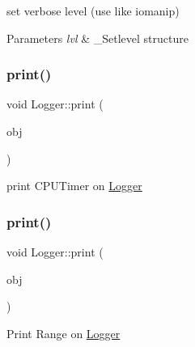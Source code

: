set verbose level (use like iomanip) 
\begin{DoxyParams}{Parameters}
{\em lvl} & \+\_\+\+Setlevel structure \\
\hline
\end{DoxyParams}
\mbox{\label{classez_1_1logging_1_1Logger_a5660d40a1364e37393b3241435ed5a64}} 
\subsubsection{\texorpdfstring{print()}{print()}\hspace{0.1cm}{\footnotesize\ttfamily [13/14]}}
{\footnotesize\ttfamily void Logger\+::print (\begin{DoxyParamCaption}\item[{const \hyperlink{classez_1_1essential_1_1CPUTimer}{ez\+::essential\+::\+C\+P\+U\+Timer} \&}]{obj }\end{DoxyParamCaption})}

print C\+P\+U\+Timer on \hyperlink{classez_1_1logging_1_1Logger}{Logger} \mbox{\label{classez_1_1logging_1_1Logger_ad95b97a1ff61d4a31a0fba5e32f805a8}} 
\subsubsection{\texorpdfstring{print()}{print()}\hspace{0.1cm}{\footnotesize\ttfamily [14/14]}}
{\footnotesize\ttfamily void Logger\+::print (\begin{DoxyParamCaption}\item[{const \hyperlink{classez_1_1essential_1_1Range}{ez\+::essential\+::\+Range} \&}]{obj }\end{DoxyParamCaption})}

Print Range on \hyperlink{classez_1_1logging_1_1Logger}{Logger} \mbox{\label{classez_1_1logging_1_1Logger_a13d4a164577e52950fc5b06508d9f158}} 
